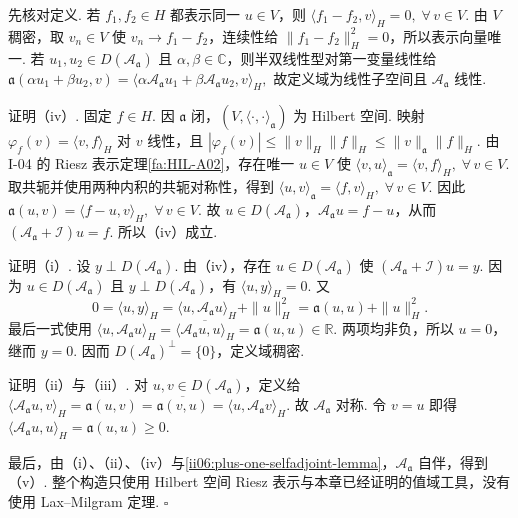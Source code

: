 \begin{FAProof}
先核对定义. 若 \(\displaystyle f_1,f_2\in H\) 都表示同一 \(\displaystyle u\in V\)，则
\(\displaystyle \langle f_1-f_2,v\rangle_H=0 ,\; \forall\,v\in V.\)
由 \(\displaystyle V\) 稠密，取 \(\displaystyle v_n\in V\) 使 \(\displaystyle v_n\to f_1-f_2\)，连续性给 \(\displaystyle\|f_1-f_2\|_H^2=0\)，所以表示向量唯一. 若 \(\displaystyle u_1,u_2\in D(\mathcal A_{\mathfrak a})\) 且 \(\displaystyle\alpha,\beta\in\mathbb C\)，则半双线性型对第一变量线性给
\(\displaystyle \mathfrak a(\alpha u_1+\beta u_2,v) = \langle\alpha\mathcal A_{\mathfrak a}u_1+\beta\mathcal A_{\mathfrak a}u_2,v\rangle_H,\)
故定义域为线性子空间且 \(\displaystyle\mathcal A_{\mathfrak a}\) 线性.

证明（iv）. 固定 \(\displaystyle f\in H\). 因 \(\displaystyle\mathfrak a\) 闭，\(\displaystyle(V,\langle\cdot,\cdot\rangle_{\mathfrak a})\) 为 Hilbert 空间. 映射
\(\displaystyle \varphi_f(v)=\langle v,f\rangle_H\)
对 \(\displaystyle v\) 线性，且
\(\displaystyle |\varphi_f(v)| \leqslant \|v\|_H\|f\|_H \leqslant \|v\|_{\mathfrak a}\|f\|_H.\)
由 I-04 的 Riesz 表示定理\autoref{fa:HIL-A02}，存在唯一 \(\displaystyle u\in V\) 使
\(\displaystyle \langle v,u\rangle_{\mathfrak a} = \langle v,f\rangle_H ,\; \forall\,v\in V.\)
取共轭并使用两种内积的共轭对称性，得到
\(\displaystyle \langle u,v\rangle_{\mathfrak a} = \langle f,v\rangle_H ,\; \forall\,v\in V.\)
因此
\(\displaystyle \mathfrak a(u,v) = \langle f-u,v\rangle_H ,\; \forall\,v\in V.\)
故 \(\displaystyle u\in D(\mathcal A_{\mathfrak a})\)，\(\displaystyle\mathcal A_{\mathfrak a}u=f-u\)，从而
\(\displaystyle (\mathcal A_{\mathfrak a}+\mathcal I)u=f.\)
所以（iv）成立.

证明（i）. 设 \(\displaystyle y\perp D(\mathcal A_{\mathfrak a})\). 由（iv），存在 \(\displaystyle u\in D(\mathcal A_{\mathfrak a})\) 使
\(\displaystyle (\mathcal A_{\mathfrak a}+\mathcal I)u=y.\)
因为 \(\displaystyle u\in D(\mathcal A_{\mathfrak a})\) 且 \(\displaystyle y\perp D(\mathcal A_{\mathfrak a})\)，有 \(\displaystyle\langle u,y\rangle_H=0\). 又
\[
0=\langle u,y\rangle_H=\langle u,\mathcal A_{\mathfrak a}u\rangle_H+\|u\|_H^2=\mathfrak a(u,u)+\|u\|_H^2.
\]
最后一式使用 \(\displaystyle\langle u,\mathcal A_{\mathfrak a}u\rangle_H=\overline{\langle\mathcal A_{\mathfrak a}u,u\rangle_H}=\mathfrak a(u,u)\in\mathbb R\). 两项均非负，所以 \(\displaystyle u=0\)，继而 \(\displaystyle y=0\). 因而 \(\displaystyle D(\mathcal A_{\mathfrak a})^\perp=\{0\}\)，定义域稠密.

证明（ii）与（iii）. 对 \(\displaystyle u,v\in D(\mathcal A_{\mathfrak a})\)，定义给
\(\displaystyle \langle\mathcal A_{\mathfrak a}u,v\rangle_H = \mathfrak a(u,v) = \overline{\mathfrak a(v,u)} = \langle u,\mathcal A_{\mathfrak a}v\rangle_H.\)
故 \(\displaystyle\mathcal A_{\mathfrak a}\) 对称. 令 \(\displaystyle v=u\) 即得
\(\displaystyle \langle\mathcal A_{\mathfrak a}u,u\rangle_H = \mathfrak a(u,u) \geqslant0.\)

最后，由（i）、（ii）、（iv）与\autoref{ii06:plus-one-selfadjoint-lemma}，\(\displaystyle\mathcal A_{\mathfrak a}\) 自伴，得到（v）. 整个构造只使用 Hilbert 空间 Riesz 表示与本章已经证明的值域工具，没有使用 Lax--Milgram 定理.
\hfill\(\square\)
\end{FAProof}

